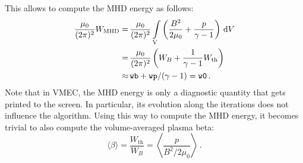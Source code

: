 This allows to compute the MHD energy as follows:
\begin{align}
 \frac{\mu_0}{(2 \pi)^2} W_\mathrm{MHD}
             =&\, \frac{\mu_0}{(2 \pi)^2} \int\limits_\mathrm{V} \left( \frac{B^2}{2 \mu_0} + \frac{p}{\gamma - 1} \right) \,\mathrm{d}V \nonumber \\
             =&\, \frac{\mu_0}{(2 \pi)^2} \left( W_B + \frac{1}{\gamma - 1} W_\mathrm{th} \right) \\
       \approx&\, \texttt{wb} + \texttt{wp} / (\gamma - 1) = \texttt{w0} \nonumber \, .
\end{align}
Note that in VMEC, the MHD energy is only a diagnostic quantity that gets printed to the screen.
In particular, its evolution along the iterations does not influence the algorithm.
Using this way to compute the MHD energy, it becomes trivial to also compute the volume-averaged plasma beta:
\begin{equation}
  \langle \beta \rangle = \frac{W_\mathrm{th}}{W_B} = \left\langle \frac{p}{B^2 / 2 \mu_0} \right\rangle \, .
\end{equation}

\FloatBarrier
